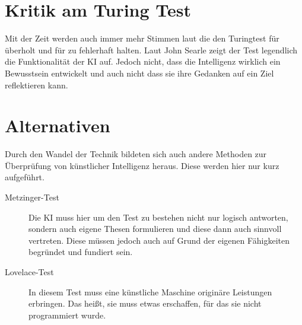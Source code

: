 \section{Kritik am Turing Test}
Mit der Zeit werden auch immer mehr Stimmen laut die den Turingtest für überholt und für zu fehlerhaft halten. Laut John Searle zeigt der Test legendlich die Funktionalität der KI auf. Jedoch nicht, dass die Intelligenz wirklich ein Bewusstsein entwickelt und auch nicht dass sie ihre Gedanken auf ein Ziel reflektieren kann. ~\cite{jaai2019}

\section{Alternativen}
Durch den Wandel der Technik bildeten sich auch andere Methoden zur Überprüfung von künstlicher Intelligenz heraus. Diese werden hier nur kurz aufgeführt. 
\begin{description}
	\item[Metzinger-Test]
		Die KI muss hier um den Test zu bestehen nicht nur logisch antworten, sondern auch eigene Thesen formulieren und diese dann auch sinnvoll vertreten. Diese müssen jedoch auch auf Grund der eigenen Fähigkeiten begründet und fundiert sein. 
	\item[Lovelace-Test] In diesem Test muss eine künstliche Maschine originäre Leistungen erbringen. Das heißt, sie muss etwas erschaffen, für das sie nicht programmiert wurde. 
\end{description}

